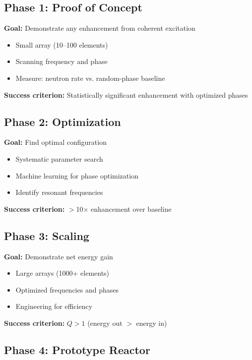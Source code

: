 \documentclass[12pt,a4paper]{article}
\begin{document}
\subsection{Phase 1: Proof of Concept}

\textbf{Goal:} Demonstrate any enhancement from coherent excitation

\begin{itemize}
    \item Small array (10--100 elements)
    \item Scanning frequency and phase
    \item Measure: neutron rate vs. random-phase baseline
\end{itemize}

\textbf{Success criterion:} Statistically significant enhancement with optimized phases

\subsection{Phase 2: Optimization}

\textbf{Goal:} Find optimal configuration

\begin{itemize}
    \item Systematic parameter search
    \item Machine learning for phase optimization
    \item Identify resonant frequencies
\end{itemize}

\textbf{Success criterion:} $>$10$\times$ enhancement over baseline

\subsection{Phase 3: Scaling}

\textbf{Goal:} Demonstrate net energy gain

\begin{itemize}
    \item Large arrays (1000+ elements)
    \item Optimized frequencies and phases
    \item Engineering for efficiency
\end{itemize}

\textbf{Success criterion:} $Q > 1$ (energy out $>$ energy in)

\subsection{Phase 4: Prototype Reactor}
\end{document}
